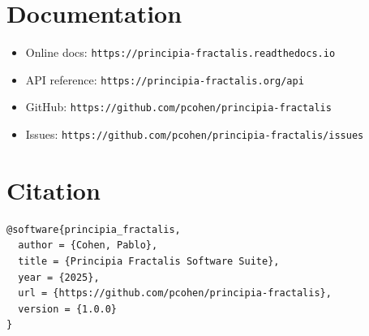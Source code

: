 \section{Documentation}

\begin{itemize}
\item Online docs: \texttt{https://principia-fractalis.readthedocs.io}
\item API reference: \texttt{https://principia-fractalis.org/api}
\item GitHub: \texttt{https://github.com/pcohen/principia-fractalis}
\item Issues: \texttt{https://github.com/pcohen/principia-fractalis/issues}
\end{itemize}

\section{Citation}

\begin{verbatim}
@software{principia_fractalis,
  author = {Cohen, Pablo},
  title = {Principia Fractalis Software Suite},
  year = {2025},
  url = {https://github.com/pcohen/principia-fractalis},
  version = {1.0.0}
}
\end{verbatim}